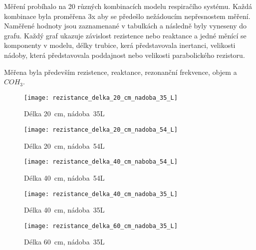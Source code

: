 Měření probíhalo na 20 různých kombinacích modelu respiračího systému. Každá kombinace byla proměřena 3x aby se předešlo nežádoucím nepřesnostem měření. Naměřené hodnoty jsou zaznamenané v tabulkách a následně byly vyneseny do grafu. Každý graf ukazuje závislost rezistence nebo reaktance a jedné měnící se komponenty v modelu, délky trubice, kerá představovala inertanci, velikosti nádoby, která představovala poddajnost nebo velikosti parabolického rezistoru.

Měřena byla především rezistence, reaktance, rezonanční frekvence, objem a $COH_{3}$. 

\begin{figure}[ht]
	\label{img:pic_rezistance_delka_20_cm_nadoba_35_L}
	\begin{center}
		\texttt{[image: rezistance\_delka\_20\_cm\_nadoba\_35\_L]}
		\caption{Délka \SI{20}{cm}, nádoba~35L}
	\end{center}
\end{figure}

\begin{figure}[ht]
	\label{img:pic_rezistance_delka_20_cm_nadoba_54_L}
	\begin{center}
		\texttt{[image: rezistance\_delka\_20\_cm\_nadoba\_54\_L]}
		\caption{Délka \SI{20}{cm}, nádoba~54L}
	\end{center}
\end{figure}

\begin{figure}[ht]
	\label{img:pic_rezistance_delka_40_cm_naboba_54_L}
	\begin{center}
		\texttt{[image: rezistance\_delka\_40\_cm\_naboba\_54\_L]}
		\caption{Délka \SI{40}{cm}, nádoba~54L}
	\end{center}
\end{figure}

\begin{figure}[ht]
	\label{img:pic_rezistance_delka_40_cm_nadoba_35_L}
	\begin{center}
		\texttt{[image: rezistance\_delka\_40\_cm\_nadoba\_35\_L]}
		\caption{Délka \SI{40}{cm}, nádoba~35L}
	\end{center}
\end{figure}

\begin{figure}[ht]
	\label{img:pic_rezistance_delka_60_cm_nadoba_35_L}
	\begin{center}
		\texttt{[image: rezistance\_delka\_60\_cm\_nadoba\_35\_L]}
		\caption{Délka \SI{60}{cm}, nádoba~35L}
	\end{center}
\end{figure}

